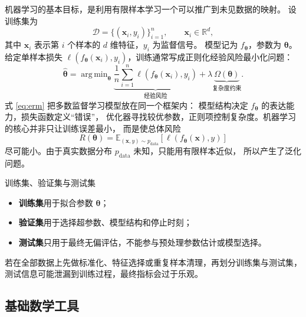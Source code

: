 \documentclass[UTF8,zihao=-4,a4paper,fontset=windows]{ctexart}
\DeclareMathOperator*{\argmin}{arg\,min}
\newcommand{\R}{\mathbb{R}}
\newcommand{\E}{\mathbb{E}}
\newcommand{\dataset}{\mathcal{D}}
\begin{document}
机器学习的基本目标，是利用有限样本学习一个可以推广到未见数据的映射。
设训练集为
\begin{equation}
  \dataset=\{(\bm{x}_i,y_i)\}_{i=1}^{n},\qquad
  \bm{x}_i\in\R^d ,
\end{equation}
其中 $\bm{x}_i$ 表示第 $i$ 个样本的 $d$ 维特征，$y_i$ 为监督信号。
模型记为 $f_{\bm{\theta}}$，参数为 $\bm{\theta}$。给定单样本损失
$\ell(f_{\bm{\theta}}(\bm{x}_i),y_i)$，训练通常写成正则化经验风险最小化问题：
\begin{equation}
  \hat{\bm{\theta}}
  =\argmin_{\bm{\theta}}
  \underbrace{\frac{1}{n}\sum_{i=1}^{n}
  \ell\!\left(f_{\bm{\theta}}(\bm{x}_i),y_i\right)}_{\text{经验风险}}
  +\lambda\underbrace{\Omega(\bm{\theta})}_{\text{复杂度约束}} .
  \label{eq:erm}
\end{equation}
式 \eqref{eq:erm} 把多数监督学习模型放在同一个框架内：
模型结构决定 $f_{\bm{\theta}}$ 的表达能力，损失函数定义“错误”，
优化器寻找较优参数，正则项控制复杂度。机器学习的核心并非只让训练误差最小，
而是使总体风险
\begin{equation}
  R(\bm{\theta})
  =\E_{(\bm{x},y)\sim p_{\mathrm{data}}}
  \left[\ell(f_{\bm{\theta}}(\bm{x}),y)\right]
\end{equation}
尽可能小。由于真实数据分布 $p_{\mathrm{data}}$ 未知，只能用有限样本近似，
所以产生了泛化问题\cite{mitchell}。

\begin{definitionbox}{训练集、验证集与测试集}
\begin{itemize}
  \item \textbf{训练集}用于拟合参数 $\bm{\theta}$；
  \item \textbf{验证集}用于选择超参数、模型结构和停止时刻；
  \item \textbf{测试集}只用于最终无偏评估，不能参与预处理参数估计或模型选择。
\end{itemize}
若在全部数据上先做标准化、特征选择或重复样本清理，再划分训练集与测试集，
测试信息可能泄漏到训练过程，最终指标会过于乐观。
\end{definitionbox}

\subsection{基础数学工具}
\end{document}
